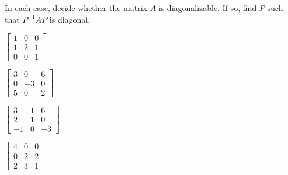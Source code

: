 \documentclass{ximera}
\begin{document}
\begin{problem}
In each case, decide whether the matrix $A$ is diagonalizable. If so, find $P$ such that $P^{-1}AP$ is diagonal.

\begin{problem}\label{prb:diagonalizable}
\item $\begin{bmatrix}
1 & 0 & 0 \\
1 & 2 & 1 \\
0 & 0 & 1
\end{bmatrix}$
\item $\begin{bmatrix}
3 &  0 & 6 \\
0 & -3 & 0 \\
5 &  0 & 2
\end{bmatrix}$
\item $\begin{bmatrix}
 3 &  1 &  6 \\
 2 &  1 &  0 \\
-1 &  0 & -3
\end{bmatrix}$
\item $\begin{bmatrix}
4 & 0 & 0 \\
0 & 2 & 2 \\
2 & 3 & 1
\end{bmatrix}$
\end{problem}


\end{problem}
\end{document}
